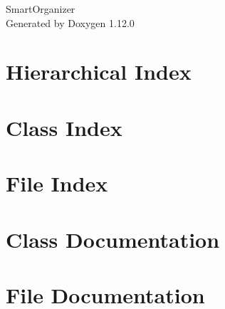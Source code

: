 \documentclass[twoside]{book}
\newcommand{\+}{\discretionary{\mbox{\scriptsize$\hookleftarrow$}}{}{}}
\newcommand{\clearemptydoublepage}{%
    \newpage{\pagestyle{empty}\cleardoublepage}%
  }
\begin{document}
  \raggedbottom
    \hypersetup{pageanchor=false,
                bookmarksnumbered=true,
                pdfencoding=unicode
               }
  \begin{titlepage}
  \vspace*{7cm}
  \begin{center}%
  {\Large Smart\+Organizer}\\
  \vspace*{1cm}
  {\large Generated by Doxygen 1.12.0}\\
  \end{center}
  \end{titlepage}
  \clearemptydoublepage
  \tableofcontents
  \clearemptydoublepage
  \hypersetup{pageanchor=true}
\chapter{Hierarchical Index}

\chapter{Class Index}

\chapter{File Index}

\chapter{Class Documentation}











\chapter{File Documentation}











  \backmatter
  \newpage
  \clearemptydoublepage
  \printindex
\end{document}
